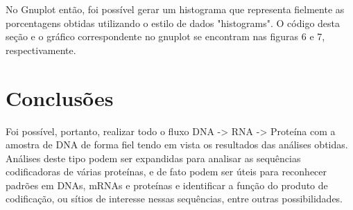 \documentclass[brazilian,12pt,a4paper,final]{article}
\begin{document}
	No Gnuplot então, foi possível gerar um histograma que representa fielmente as porcentagens obtidas utilizando o estilo de dados "histograms". O código desta seção e o gráfico correspondente no gnuplot se encontram nas figuras 6 e 7, respectivamente.
	
	
	
	\section{Conclusões}
	Foi possível, portanto, realizar todo o fluxo DNA -> RNA -> Proteína com a amostra de DNA de forma fiel tendo em vista os resultados das análises obtidas. Análises deste tipo podem ser expandidas para analisar as sequências codificadoras de várias proteínas, e de fato podem ser úteis para reconhecer padrões em DNAs, mRNAs e proteínas e identificar a função do produto de codificação, ou sítios de interesse nessas sequências, entre outras possibilidades.
	
	
\end{document}
